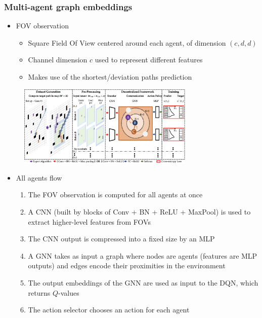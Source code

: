 \documentclass{beamer}
\begin{document}
\begin{frame}[allowframebreaks]
	\frametitle{Multi-agent graph embeddings}
	\begin{itemize}
		\item FOV observation
		\begin{itemize}
			\item Square Field Of View centered around each agent, of dimension $(c, d, d)$
			\item Channel dimension $c$ used to represent different features
			\item Makes use of the shortest/deviation paths prediction
		\end{itemize}
	\end{itemize}
	\begin{figure}[h]
		\centering
		\includegraphics[width=0.75\textwidth]{dqn-gnn-robot.png}
	\end{figure}
	\framebreak
	\begin{itemize}
		\item All agents flow
		\begin{enumerate}
			\item The FOV observation is computed for all agents at once
			\item A CNN (built by blocks of Conv + BN + ReLU + MaxPool) is used to extract higher-level features from FOVs 
			\item The CNN output is compressed into a fixed size by an MLP
			\item A GNN takes as input a graph where nodes are agents (features are MLP outputs) and edges encode their proximities in the environment 
			\item The output embeddings of the GNN are used as input to the DQN, which returns $Q$-values
			\item The action selector chooses an action for each agent 
		\end{enumerate}
	\end{itemize}
\end{frame}
\end{document}
